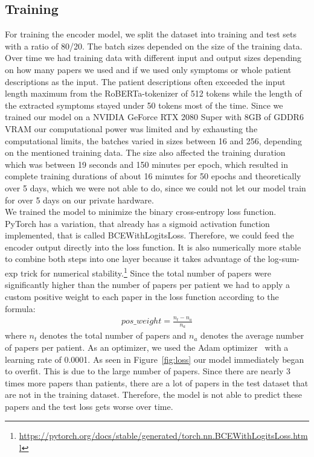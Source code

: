 \subsection{Training}
For training the encoder model, we split the dataset into training and test sets with a ratio of 80/20. The batch sizes depended on the size of the training data. Over time we had training data with different input and output sizes depending on how many papers we used and if we used only symptoms or whole patient descriptions as the input. The patient descriptions often exceeded the input length maximum from the RoBERTa-tokenizer of 512 tokens while the length of the extracted symptoms stayed under 50 tokens most of the time. Since we trained our model on a NVIDIA GeForce RTX 2080 Super with 8GB of GDDR6 VRAM our computational power was limited and by exhausting the computational limits, the batches varied in sizes between 16 and 256, depending on the mentioned training data. The size also affected the training duration which was between 19 seconds and 150 minutes per epoch, which resulted in complete training durations of about 16 minutes for 50 epochs and theoretically over 5 days, which we were not able to do, since we could not let our model train for over 5 days on our private hardware.\\
We trained the model to minimize the binary cross-entropy loss function. PyTorch has a variation, that already has a sigmoid activation function implemented, that is called BCEWithLogitsLoss. Therefore, we could feed the encoder output directly into the loss function. It is also numerically more stable to combine both steps into one layer because it takes advantage of the log-sum-exp trick for numerical stability.\footnote{\url{https://pytorch.org/docs/stable/generated/torch.nn.BCEWithLogitsLoss.html}} Since the total number of papers were significantly higher than the number of papers per patient we had to apply a custom positive weight to each paper in the loss function according to the formula:
\begin{align*}
    pos\_weight = \frac{n_t - n_a}{n_a}
\end{align*}
where $n_t$ denotes the total number of papers and $n_a$ denotes the average number of papers per patient.
As an optimizer, we used the Adam optimizer~\cite{diederik2014adam} with a learning rate of 0.0001. As seen in Figure~\ref{fig:loss} our model immediately began to overfit. This is due to the large number of papers. Since there are nearly 3 times more papers than patients, there are a lot of papers in the test dataset that are not in the training dataset. Therefore, the model is not able to predict these papers and the test loss gets worse over time.

